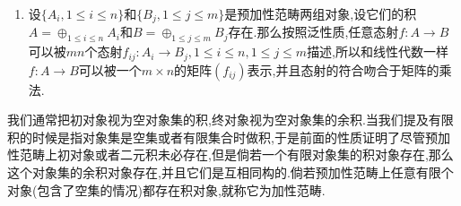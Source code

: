 \begin{enumerate}
\begin{proof}
		按照对偶性,我们仅需验证1和3的等价性.1推3,按照积的泛性质,存在唯一的态射$i_A$满足$p_A\circ i_A=1_A$和$p_B\circ i_A=0$,也存在唯一的态射$i_B$满足$p_A\circ i_B=0$和$p_B\circ i_B=1_B$.于是得到如下等式,泛性质就说明$i_A\circ p_A+i_B\circ p_B=1_C$.
		$$p_A\circ\left(i_A\circ p_A+i_B\circ p_B=1_C\right)=p_A=p_A\circ 1_C$$
		$$p_B\circ\left(i_A\circ p_A+i_B\circ p_B=1_C\right)=p_B=p_B\circ 1_C$$
		
		3推1,假设有态射$f:D\to A$和$g:D\to C$,需要验证积对象的泛性质.构造$h=i_A\circ f+i_B\circ g$,那么有$p_A\circ h=f$和$p_B\circ h=g$.假设$h':D\to C$是满足这两个等式的态射,那么$h'=(i_A\circ p_A+i_B\circ p_B)\circ h'=i_A\circ f+i_B\circ g=h$,这说明唯一性,于是$(C,p_A,p_B)$是积对象.
		
		现在假设这些等价的条件都成立,我们来证明$i_A=\ker p_B$,其余的证明都是对偶的.首先$p_B\circ i_A=0$,倘若$x:D\to C$满足$p_B\circ x=0$,从$p_B\circ i_B=1_B$得到$p_B$是满态射,于是从$p_B\circ i_A\circ p_A\circ x=0=p_B\circ x$得到$i_A\circ p_A\circ x=x$,于是$x$经$i_A$分解.这个分解的唯一性是因为从$p_A\circ i_A=1_A$得到$i_A$是单态射.完成证明.
	\end{proof}
    \item 设$\{A_i,1\le i\le n\}$和$\{B_j,1\le j\le m\}$是预加性范畴两组对象,设它们的积$A=\oplus_{1\le i\le n}A_i$和$B=\oplus_{1\le j\le m}B_j$存在.那么按照泛性质,任意态射$f:A\to B$可以被$mn$个态射$f_{ij}:A_i\to B_j,1\le i\le n,1\le j\le m$描述,所以和线性代数一样$f:A\to B$可以被一个$m\times n$的矩阵$\left(f_{ij}\right)$表示,并且态射的符合吻合于矩阵的乘法.
\end{enumerate}

我们通常把初对象视为空对象集的积,终对象视为空对象集的余积.当我们提及有限积的时候是指对象集是空集或者有限集合时做积,于是前面的性质证明了尽管预加性范畴上初对象或者二元积未必存在,但是倘若一个有限对象集的积对象存在,那么这个对象集的余积对象存在,并且它们是互相同构的.倘若预加性范畴上任意有限个对象(包含了空集的情况)都存在积对象,就称它为加性范畴.

